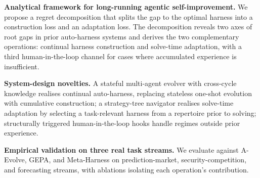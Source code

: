\begin{compactenum}[(1)]
  \item {\textbf{Analytical framework for long-running agentic self-improvement.} We propose a regret decomposition that splits the gap to the optimal harness into a construction loss and an adaptation loss. The decomposition reveals two axes of root gaps in prior auto-harness systems and derives the two complementary operations: continual harness construction and solve-time adaptation, with a third human-in-the-loop channel for cases where accumulated experience is insufficient.}
  \item {\textbf{System-design novelties.} A stateful multi-agent evolver with cross-cycle knowledge realises continual auto-harness, replacing stateless one-shot evolution with cumulative construction; a strategy-tree navigator realises solve-time adaptation by selecting a task-relevant harness from a repertoire prior to solving; structurally triggered human-in-the-loop hooks handle regimes outside prior experience.}
  \item \textbf{Empirical validation on three real task streams.} We evaluate against A-Evolve, GEPA, and Meta-Harness on prediction-market, security-competition, and forecasting streams, with ablations isolating each operation's contribution.
\end{compactenum}






